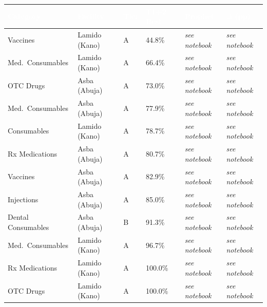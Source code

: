 \documentclass[12pt, a4paper]{article}
\begin{document}
\noindent
\begin{tabularx}{\textwidth}{@{} L{3.6cm} L{3.2cm} C{0.7cm} R{2.0cm} R{2.2cm} R{2.2cm} @{}}
  \toprule
  \textcolor{white}{\textbf{Category}} &
  \textcolor{white}{\textbf{Facility}} &
  \textcolor{white}{\textbf{Tier}} &
  \textcolor{white}{\textbf{T1+2 Best}} &
  \textcolor{white}{\textbf{Prophet}} &
  \textcolor{white}{\textbf{$\Delta$ (pp)}} \\
  \midrule
  Vaccines           & Lamido (Kano)  & A &
    44.8\% & \textit{see notebook} & \textit{see notebook} \\
  Med.\ Consumables  & Lamido (Kano)  & A &
    66.4\% & \textit{see notebook} & \textit{see notebook} \\
  OTC Drugs          & Asba (Abuja)   & A &
    73.0\% & \textit{see notebook} & \textit{see notebook} \\
  Med.\ Consumables  & Asba (Abuja)   & A &
    77.9\% & \textit{see notebook} & \textit{see notebook} \\
  Consumables        & Lamido (Kano)  & A &
    78.7\% & \textit{see notebook} & \textit{see notebook} \\
  Rx Medications     & Asba (Abuja)   & A &
    80.7\% & \textit{see notebook} & \textit{see notebook} \\
  Vaccines           & Asba (Abuja)   & A &
    82.9\% & \textit{see notebook} & \textit{see notebook} \\
  Injections         & Asba (Abuja)   & A &
    85.0\% & \textit{see notebook} & \textit{see notebook} \\
  Dental Consumables & Asba (Abuja)   & B &
    91.3\% & \textit{see notebook} & \textit{see notebook} \\
  Med.\ Consumables  & Lamido (Kano)  & A &
    96.7\% & \textit{see notebook} & \textit{see notebook} \\
  Rx Medications     & Lamido (Kano)  & A &
    100.0\% & \textit{see notebook} & \textit{see notebook} \\
  OTC Drugs          & Lamido (Kano)  & A &
    100.0\% & \textit{see notebook} & \textit{see notebook} \\

\end{tabularx}
\end{document}
